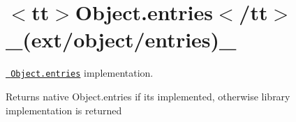 \chapter{\texorpdfstring{$<$}{<}tt\texorpdfstring{$>$}{>}Object.\+entries\texorpdfstring{$<$}{<}/tt\texorpdfstring{$>$}{>} \+\_\+(ext/object/entries)\+\_\+}
\hypertarget{md__2home_2solype_2delivery_2current__days_2Mannheim_2front_2node__modules_2ext_2docs_2object_2entries}{}\label{md__2home_2solype_2delivery_2current__days_2Mannheim_2front_2node__modules_2ext_2docs_2object_2entries}
\label{md__2home_2solype_2delivery_2current__days_2Mannheim_2front_2node__modules_2ext_2docs_2object_2entries_autotoc_md2574}%
%
 \href{https://developer.mozilla.org/en-US/docs/Web/JavaScript/Reference/Global_Objects/Object/entries}{\texttt{ Object.\+entries}} implementation.

Returns native {\ttfamily Object.\+entries} if it\textquotesingle{}s implemented, otherwise library implementation is returned


\begin{DoxyCode}{0}
\DoxyCodeLine{}

\end{DoxyCode}
 
